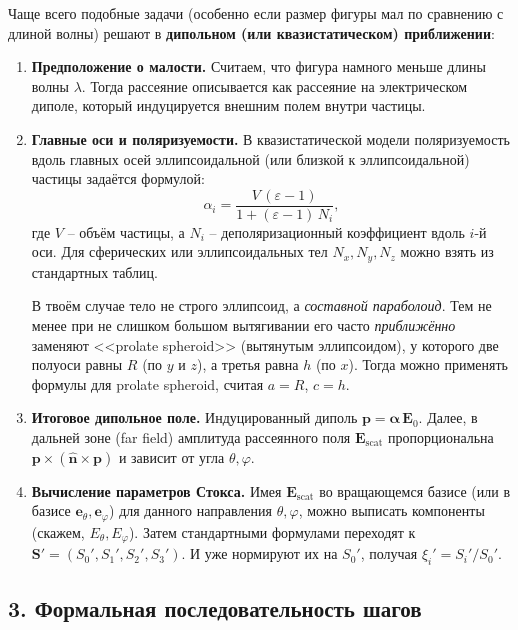 \documentclass{article}
\begin{document}
Чаще всего подобные задачи (особенно если размер фигуры мал по сравнению с длиной волны) решают в \textbf{дипольном (или квазистатическом) приближении}:

\begin{enumerate}
    \item \textbf{Предположение о малости.} Считаем, что фигура намного меньше длины волны $\lambda$. Тогда рассеяние описывается как рассеяние на электрическом диполе, который индуцируется внешним полем внутри частицы.

    \item \textbf{Главные оси и поляризуемости.} В квазистатической модели поляризуемость вдоль главных осей эллипсоидальной (или близкой к эллипсоидальной) частицы задаётся формулой:
    \[
      \alpha_i = \frac{V\,(\varepsilon - 1)}{1 + (\varepsilon - 1)\,N_i},
    \]
    где $V$ – объём частицы, а $N_i$ – деполяризационный коэффициент вдоль $i$-й оси. Для сферических или эллипсоидальных тел $N_x,N_y,N_z$ можно взять из стандартных таблиц.

    В твоём случае тело не строго эллипсоид, а \emph{составной параболоид}. Тем не менее при не слишком большом вытягивании его часто \emph{приближённо} заменяют <<prolate spheroid>> (вытянутым эллипсоидом), у которого две полуоси равны $R$ (по $y$ и $z$), а третья равна $h$ (по $x$). Тогда можно применять формулы для prolate spheroid, считая $a = R$, $c = h$.

    \item \textbf{Итоговое дипольное поле.} Индуцированный диполь $\mathbf{p} = \boldsymbol{\alpha}\,\mathbf{E}_0$. Далее, в дальней зоне (far field) амплитуда рассеянного поля $\mathbf{E}_\text{scat}$ пропорциональна $\mathbf{p}\times(\mathbf{\hat{n}}\times\mathbf{p})$ и зависит от угла $\theta, \varphi$.

    \item \textbf{Вычисление параметров Стокса.} Имея $\mathbf{E}_\text{scat}$ во вращающемся базисе (или в базисе $\mathbf{e}_\theta, \mathbf{e}_\varphi$) для данного направления $\theta, \varphi$, можно выписать компоненты (скажем, $E_{\theta}, E_{\varphi}$). Затем стандартными формулами переходят к $\mathbf{S}' = (S_0', S_1', S_2', S_3')$. И уже нормируют их на $S_0'$, получая $\xi_i' = S_i'/S_0'$.
\end{enumerate}

\subsection*{3. Формальная последовательность шагов}
\end{document}
